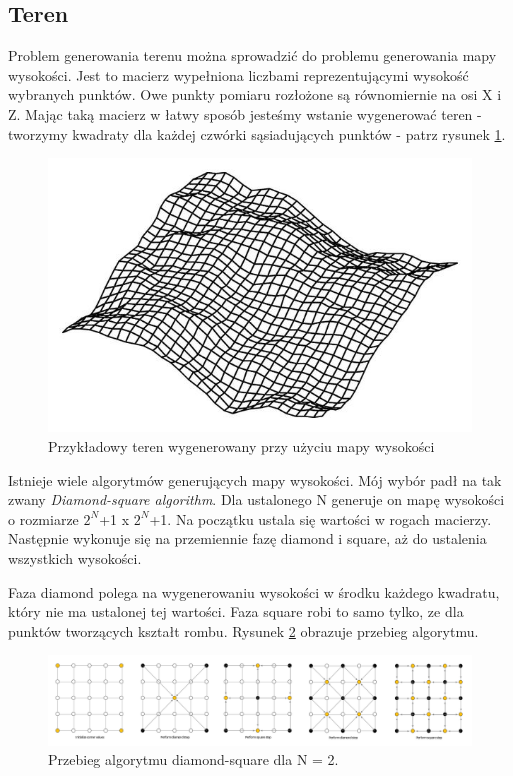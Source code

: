 \documentclass[inz,longabstract]{iithesis}
\begin{document}
        \subsection{Teren}
            Problem generowania terenu można sprowadzić do problemu generowania mapy wysokości. Jest to macierz wypełniona liczbami reprezentującymi wysokość wybranych punktów. Owe punkty pomiaru rozłożone są równomiernie na osi X i Z. Mając taką macierz w łatwy sposób jesteśmy wstanie wygenerować teren - tworzymy kwadraty dla każdej czwórki sąsiadujących punktów - patrz rysunek \ref{fig:heightmap}. 
            \begin{figure}[H]
                \includegraphics[width=\linewidth]{heightmap.png}
                \caption{Przykładowy teren wygenerowany przy użyciu mapy wysokości\cite{heightmap}} 
                \label{fig:heightmap}
            \end{figure}
            
            Istnieje wiele algorytmów generujących mapy wysokości. Mój wybór padł na tak zwany \textit{Diamond-square algorithm}. Dla ustalonego N generuje on mapę wysokości o rozmiarze $2^N$+1 x $2^N$+1. Na początku ustala się wartości w rogach macierzy. Następnie wykonuje się na przemiennie fazę diamond i square, aż do ustalenia wszystkich wysokości. 
            
            Faza diamond polega na wygenerowaniu wysokości w środku każdego kwadratu, który nie ma ustalonej tej wartości. Faza square robi to samo tylko, ze dla punktów tworzących kształt rombu. Rysunek \ref{fig:diamondSquare} obrazuje przebieg algorytmu. 
            \begin{figure}[H]
                \includegraphics[width=\linewidth]{diamondSquare.png}
                \caption{Przebieg algorytmu diamond-square dla N = 2.} 
                \label{fig:diamondSquare}
            \end{figure}
            
\end{document}
